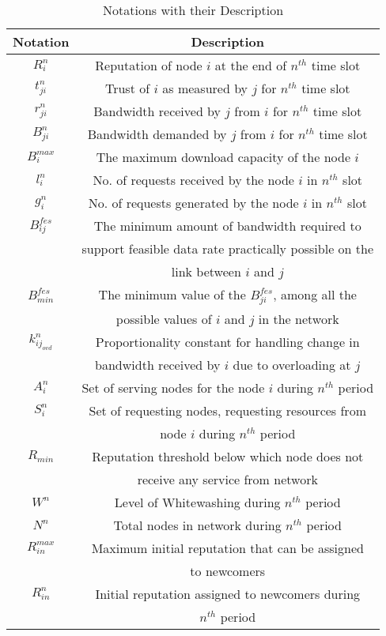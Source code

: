 \documentclass[journal]{IEEEtran}
\begin{document}
\begin{table}[]
	\caption{Notations with their Description}
	\centering
	\begin{tabular}{ |c|c|}
		\hline
		\textbf{Notation}  &\textbf{Description} \\
		
		\hline
		$R_{i}^n$ &Reputation of node $i$  at the end of  $n^{th}$ time slot\\
		\hline
		$t_{ji}^n$ &Trust of $i$ as measured by  $j$ for  $n^{th}$ time slot\\
		\hline
		$r_{ji}^n$ &Bandwidth received by $j$ from $i$ for $n^{th}$ time slot\\
		\hline
		$B_{ji}^n$ &Bandwidth demanded  by $j$ from  $i$ for $n^{th}$ time slot\\
		\hline
		$B_i^{max}$ &The maximum download capacity of the node $i$  \\
		\hline
		$l_i^n$ &No. of requests received by the node $i$ in $n^{th}$ slot \\ 
		\hline
		$g_i^n$ &No. of requests generated by the node $i$ in $n^{th}$ slot \\ 
		\hline
		$B_{ij}^{fes}$ &The minimum amount of bandwidth required to  \\
		& support feasible data rate practically possible on the  \\   
		& link between $i$ and $j$\\
		\hline
		$B^{fes}_{min}$ &The minimum value of the $B_{ji}^{fes}$, among all the\\ 
		&   possible values of $i$ and $j$ in the network \\ 
		\hline
		$k_{{ij}_{ovd}}^{n}$ &Proportionality constant for handling change in \\
		& bandwidth received by $i$ due to overloading at $j$\\ 
		\hline
		$A^{n}_i$   & Set of serving nodes for the node $i$ during $n^{th}$ period\\
		\hline
		$S^{n}_i$   & Set of requesting nodes, requesting resources from \\
		
		&   node $i$ during $n^{th}$ period\\
		\hline
		${R_{min}}$ & Reputation threshold below which node does not \\
		& receive any service from network\\
		\hline
		$W^n$         & Level of Whitewashing during $n^{th}$ period\\
		\hline
		$N^n$      & Total nodes in network during $n^{th}$ period\\
		\hline
		${R_{in}^{max}}$ & Maximum initial reputation that can be assigned \\ 
		& to newcomers\\
		\hline 
		${R_{in}^n}$  &  Initial reputation assigned to newcomers during \\
		& $n^{th}$ period\\  
		\hline
	\end{tabular}
	\label{rep_tab}
\end{table}       
\end{document}
